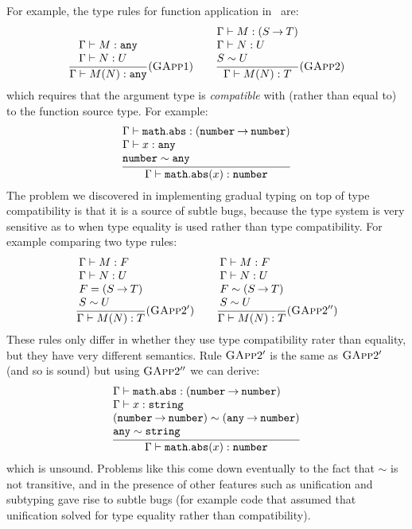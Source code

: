 \documentclass[acmsmall,review,screen]{acmart}
\makeatletter
\newcommand{\infer}[2]{\frac{\displaystyle\begin{array}{@{}l@{}}#1\end{array}}{\displaystyle#2}}
\newcommand{\ANY}{\mathtt{any}}
\newcommand{\NUMBER}{\mathtt{number}}
\newcommand{\STRING}{\mathtt{string}}
\newcommand{\fun}{\mathbin{\rightarrow}}
\newcommand{\compat}{\sim}
\makeatother
\begin{document}
For example, the type rules for function application
in~\cite{ST06:GradualTyping} are:
\[
    \infer{
      \Gamma \vdash M : \ANY \\
      \Gamma \vdash N : U
    }{
      \Gamma \vdash M(N) : \ANY
    }
    (\textsc{GApp}1)
\qquad
    \infer{
      \Gamma \vdash M : (S \fun T) \\
      \Gamma \vdash N : U \\
      S \compat U
    }{
      \Gamma \vdash M(N) : T
    }
    (\textsc{GApp}2)
\]
which requires that the argument type is \emph{compatible} with
(rather than equal to) to the function source type.
For example:
\[
    \infer{
      \Gamma \vdash \mathtt{math.abs} : (\NUMBER \fun \NUMBER) \\
      \Gamma \vdash x : \ANY \\
      \NUMBER \compat \ANY
    }{
      \Gamma \vdash \mathtt{math.abs}(x) : \NUMBER
    }
\]
The problem we discovered in implementing gradual typing on top of type
compatibility is that it is a source of subtle bugs, because the type
system is very sensitive as to when type equality is used rather than
type compatibility. For example comparing two type rules:
\[
    \infer{
      \Gamma \vdash M : F \\
      \Gamma \vdash N : U \\
      F = (S \fun T) \\
      S \compat U
    }{
      \Gamma \vdash M(N) : T
    }
    (\textsc{GApp}2')
 \qquad
    \infer{
      \Gamma \vdash M : F \\
      \Gamma \vdash N : U \\
      F \compat (S \fun T) \\
      S \compat U
    }{
      \Gamma \vdash M(N) : T
    }
    (\textsc{GApp}2'')
\]
These rules only differ in whether they use type compatibility
rater than equality, but they have very different semantics. Rule
$\textsc{GApp}2'$ is the same as $\textsc{GApp}2'$ (and so is sound)
but using $\textsc{GApp}2''$ we can derive:
\[
    \infer{
      \Gamma \vdash \mathtt{math.abs} : (\NUMBER \fun \NUMBER) \\
      \Gamma \vdash x : \STRING \\
      (\NUMBER \fun \NUMBER) \compat (\ANY \fun \NUMBER) \\
      \ANY \compat \STRING \\
    }{
      \Gamma \vdash \mathtt{math.abs}(x) : \NUMBER
    }
\]
which is unsound. Problems like this come down eventually to the fact
that $\compat$ is not transitive, and in the presence of other
features such as unification and subtyping gave rise to subtle bugs
(for example code that assumed that unification solved for type
equality rather than compatibility).
\end{document}
